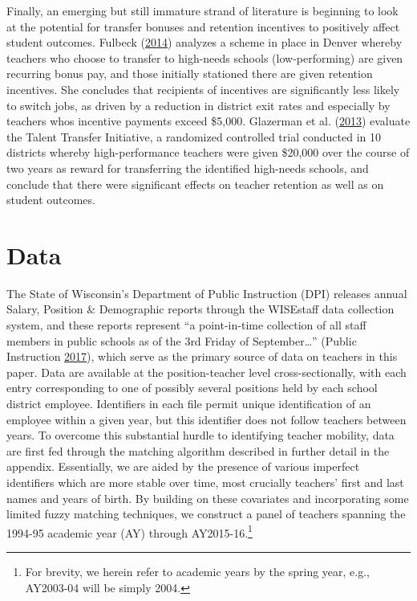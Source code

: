 \documentclass[]{article}
\let\rmarkdownfootnote\footnote%
\def\footnote{\protect\rmarkdownfootnote}
\begin{document}
Finally, an emerging but still immature strand of literature is
beginning to look at the potential for transfer bonuses and retention
incentives to positively affect student outcomes. Fulbeck
(\protect\hyperlink{ref-fulbeck}{2014}) analyzes a scheme in place in
Denver whereby teachers who choose to transfer to high-needs schools
(low-performing) are given recurring bonus pay, and those initially
stationed there are given retention incentives. She concludes that
recipients of incentives are significantly less likely to switch jobs,
as driven by a reduction in district exit rates and especially by
teachers whos incentive payments exceed \$5,000. Glazerman et al.
(\protect\hyperlink{ref-glazerman}{2013}) evaluate the Talent Transfer
Initiative, a randomized controlled trial conducted in 10 districts
whereby high-performance teachers were given \$20,000 over the course of
two years as reward for transferring the identified high-needs schools,
and conclude that there were significant effects on teacher retention as
well as on student outcomes.

\section{Data}\label{data}

The State of Wisconsin's Department of Public Instruction (DPI) releases
annual Salary, Position \& Demographic reports through the WISEstaff
data collection system, and these reports represent ``a point-in-time
collection of all staff members in public schools as of the 3rd Friday
of September\ldots{}'' (Public Instruction
\protect\hyperlink{ref-dpi}{2017}), which serve as the primary source of
data on teachers in this paper. Data are available at the
position-teacher level cross-sectionally, with each entry corresponding
to one of possibly several positions held by each school district
employee. Identifiers in each file permit unique identification of an
employee within a given year, but this identifier does not follow
teachers between years. To overcome this substantial hurdle to
identifying teacher mobility, data are first fed through the matching
algorithm described in further detail in the appendix. Essentially, we
are aided by the presence of various imperfect identifiers which are
more stable over time, most crucially teachers' first and last names and
years of birth. By building on these covariates and incorporating some
limited fuzzy matching techniques, we construct a panel of teachers
spanning the 1994-95 academic year (AY) through AY2015-16.\footnote{For
  brevity, we herein refer to academic years by the spring year, e.g.,
  AY2003-04 will be simply 2004.}
\end{document}
